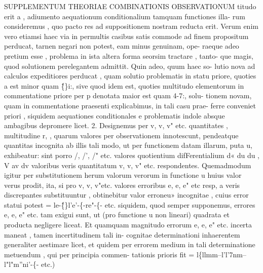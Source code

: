 \documentclass[12pt,a4paper]{article}
\begin{document}
 SUPPLEMENTUM THEORIAE COMBINATIONIS OBSERVATIONUM
titudo erit a , adiumento aequationum conditionalium tamquam functiones illa-
rum consideremus , quo pacto res ad suppositionem nostram reducta erit.
Verum enim vero etiamsi haec via in permultis casibus satis commode ad
finem propositum perducat, tarnen negari non potest, eam minus genuinam, ope-
raeque adeo pretium esse , problema in ista altera forma seorsim tractare , tanto-
que magis, quod solutionem perelegantem admittit. Quin adeo, quum haec so-
lutio nova ad calculos expeditiores perducat , quam solutio problematis in statu
priore, quoties a est minor quam \^\{\}i:, sive quod idem est, quoties multitudo
elementorum in commentatione priore per p denotata maior est quam 4-7:, solu-
tionem novam, quam in commentatione praesenti explicabimus, in tali casu prae-
ferre conveniet priori , siquidem aequationes conditionales e problematis indole
absque ambagibus depromere licet.
2.
Designemus per v, v, v" etc. quantitates , multitudine r, , quarum valores
per observationem innotescunt, pendeatque quantitas incognita ab illis tali modo,
ut per functionem datam illarum, puta u, exhibeatur: sint porro /, /', /" etc.
valores quotientium difFerentialium
d« du du ,
V av dv
valoribus veris quantitatum v, v, v" etc. respondentes. Quemadmodum igitur per
substitutionem herum valorum verorum in functione u huius valor verus prodit,
ita, si pro v, v, v"etc. valores erroribus e, e, e" etc resp, a veris discrepantes
substituuntur , obtinebitur valor erroneu» incognitae , cuius error statui potest
= le-\^\{\}l'e'-\{-re"-\{- etc.
siquidem, quod semper supponemus, errores e, e, e" etc. tam exigui sunt, ut
(pro functione u non lineari) quadrata et producta negligere liceat. Et quamquam
magnitudo errorum e, e, e" etc. incerta maneat , tamen incertitudinem tali in-
cognitae determinationi inhaerentem generaliter aestimare licet, et quidem per
errorem medium in tali determinatione metuendum , qui per principia commen-
tationis prioris fit
= l\{llmm--l'l'7nm--l"l"m''ni'-\{- etc.)
\end{document}
